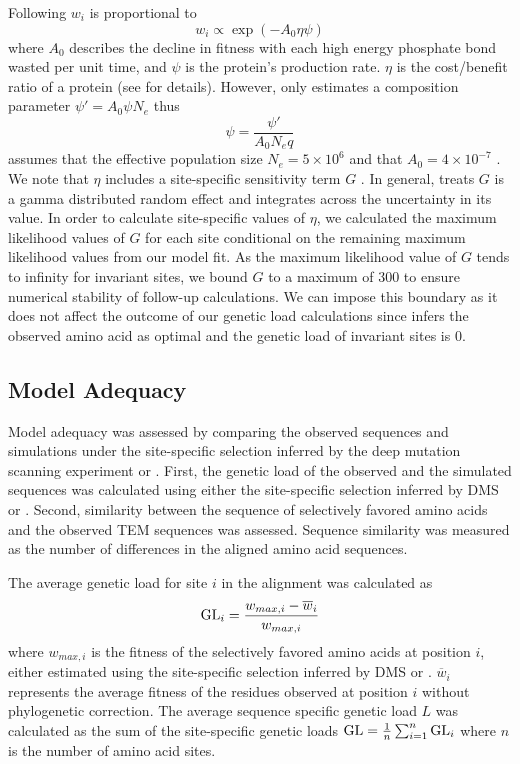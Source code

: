 \documentclass[fleqn,letterpaper]{article}
\begin{document}
Following \citet{beaulieu2019} $w_i$ is proportional to
\begin{equation}
w_i \propto \exp(-A_0\eta\psi)
\end{equation}
where $A_0$ describes the decline in fitness with each high energy phosphate bond wasted per unit time, and $\psi$ is the protein's production rate.
$\eta$ is the cost/benefit ratio of a protein (see \citet{beaulieu2019} for details). 
However, \selac only estimates a composition parameter $\psi' = A_0\psi N_e$ thus
\begin{equation}
\psi = \frac{\psi'}{A_0N_eq}
\end{equation}
\selac assumes that the effective population size $N_e = 5\times 10^6$ and that $A_0 = 4 \times 10^{-7}$ \citep{gilchrist2007}.
We note that $\eta$ includes a site-specific sensitivity term $G$ \citep{beaulieu2019}.
In general, \selac treats $G$ is a gamma distributed random effect and integrates across the uncertainty in its value.
In order to calculate site-specific values of $\eta$, we calculated the maximum likelihood values of $G$ for each site conditional on the remaining maximum likelihood values from our \selac model fit.
As the maximum likelihood value of $G$ tends to infinity for invariant sites, we bound $G$ to a maximum of 300 to ensure numerical stability of follow-up calculations.
We can impose this boundary as it does not affect the outcome of our genetic load calculations since \selac infers the observed amino acid as optimal and the genetic load of invariant sites is 0.

\subsection{Model Adequacy}

Model adequacy was assessed by comparing the observed sequences and simulations under the site-specific selection inferred by the deep mutation scanning experiment or \selac.
First, the genetic load of the observed and the simulated sequences was calculated using either the site-specific selection inferred by DMS or \selac.
Second, similarity between the sequence of selectively favored amino acids and the observed TEM sequences was assessed.
Sequence similarity was measured as the number of differences in the aligned amino acid sequences.

The average genetic load for site $i$ in the alignment was calculated as
\begin{equation}
\text{GL}_i = \frac{w_{max,i} - \overline{w}_i}{w_{max,i}}
\end{equation}
where $w_{max,i}$ is the fitness of the selectively favored amino acids at position $i$, either estimated using the site-specific selection inferred by DMS or \selac.
$\overline{w}_i$ represents the average fitness of the residues observed at position $i$ without phylogenetic correction.
The average sequence specific genetic load $L$ was calculated as the sum of the site-specific genetic loads $\text{GL} = \frac{1}{n}\sum_{i=1}^n \text{GL}_i$ where $n$ is the number of amino acid sites.
\end{document}
